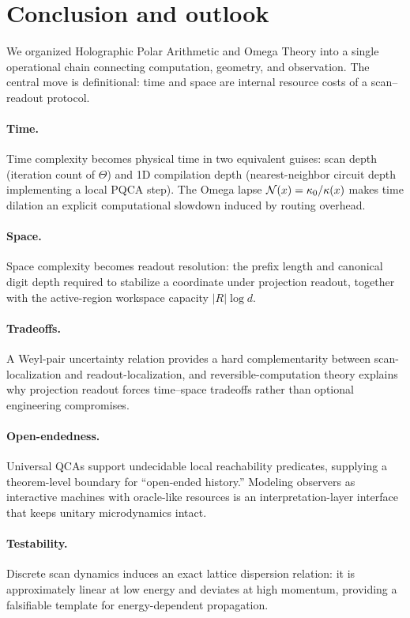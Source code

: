 \section{Conclusion and outlook}
\label{sec:conclusion}

We organized Holographic Polar Arithmetic and Omega Theory into a single operational chain connecting computation, geometry, and observation.
The central move is definitional: time and space are internal resource costs of a scan--readout protocol.

\paragraph{Time.}
Time complexity becomes physical time in two equivalent guises: scan depth (iteration count of $\Theta$) and 1D compilation depth (nearest-neighbor circuit depth implementing a local PQCA step). The Omega lapse $\mathcal{N}(x)=\kappa_0/\kappa(x)$ makes time dilation an explicit computational slowdown induced by routing overhead.

\paragraph{Space.}
Space complexity becomes readout resolution: the prefix length and canonical digit depth required to stabilize a coordinate under projection readout, together with the active-region workspace capacity $|R|\log d$.

\paragraph{Tradeoffs.}
A Weyl-pair uncertainty relation provides a hard complementarity between scan-localization and readout-localization, and reversible-computation theory explains why projection readout forces time--space tradeoffs rather than optional engineering compromises.

\paragraph{Open-endedness.}
Universal QCAs support undecidable local reachability predicates, supplying a theorem-level boundary for ``open-ended history.'' Modeling observers as interactive machines with oracle-like resources is an interpretation-layer interface that keeps unitary microdynamics intact.

\paragraph{Testability.}
Discrete scan dynamics induces an exact lattice dispersion relation: it is approximately linear at low energy and deviates at high momentum, providing a falsifiable template for energy-dependent propagation.

